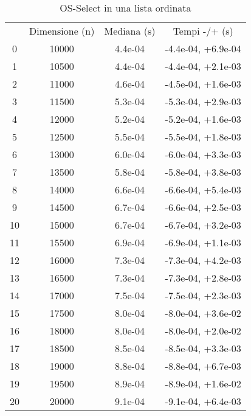 \begin{table}
\centering
\caption{OS-Select in una lista ordinata}
\label{OS-Select in una lista ordinata}
\begin{adjustbox}{width=1\textwidth/2}
\begin{tabular}{|c|c|c|c|}
\hline
 & Dimensione (n) & Mediana (s) & Tempi -/+ (s) \\
0 & 10000 & 4.4e-04 & -4.4e-04, +6.9e-04 \\
\cline{1-4}
1 & 10500 & 4.4e-04 & -4.4e-04, +2.1e-03 \\
\cline{1-4}
2 & 11000 & 4.6e-04 & -4.5e-04, +1.6e-03 \\
\cline{1-4}
3 & 11500 & 5.3e-04 & -5.3e-04, +2.9e-03 \\
\cline{1-4}
4 & 12000 & 5.2e-04 & -5.2e-04, +1.6e-03 \\
\cline{1-4}
5 & 12500 & 5.5e-04 & -5.5e-04, +1.8e-03 \\
\cline{1-4}
6 & 13000 & 6.0e-04 & -6.0e-04, +3.3e-03 \\
\cline{1-4}
7 & 13500 & 5.8e-04 & -5.8e-04, +3.8e-03 \\
\cline{1-4}
8 & 14000 & 6.6e-04 & -6.6e-04, +5.4e-03 \\
\cline{1-4}
9 & 14500 & 6.7e-04 & -6.6e-04, +2.5e-03 \\
\cline{1-4}
10 & 15000 & 6.7e-04 & -6.7e-04, +3.2e-03 \\
\cline{1-4}
11 & 15500 & 6.9e-04 & -6.9e-04, +1.1e-03 \\
\cline{1-4}
12 & 16000 & 7.3e-04 & -7.3e-04, +4.2e-03 \\
\cline{1-4}
13 & 16500 & 7.3e-04 & -7.3e-04, +2.8e-03 \\
\cline{1-4}
14 & 17000 & 7.5e-04 & -7.5e-04, +2.3e-03 \\
\cline{1-4}
15 & 17500 & 8.0e-04 & -8.0e-04, +3.6e-02 \\
\cline{1-4}
16 & 18000 & 8.0e-04 & -8.0e-04, +2.0e-02 \\
\cline{1-4}
17 & 18500 & 8.5e-04 & -8.5e-04, +3.3e-03 \\
\cline{1-4}
18 & 19000 & 8.8e-04 & -8.8e-04, +6.7e-03 \\
\cline{1-4}
19 & 19500 & 8.9e-04 & -8.9e-04, +1.6e-02 \\
\cline{1-4}
20 & 20000 & 9.1e-04 & -9.1e-04, +6.4e-03 \\
\cline{1-4}
\end{tabular}
\end{adjustbox}
\end{table}

